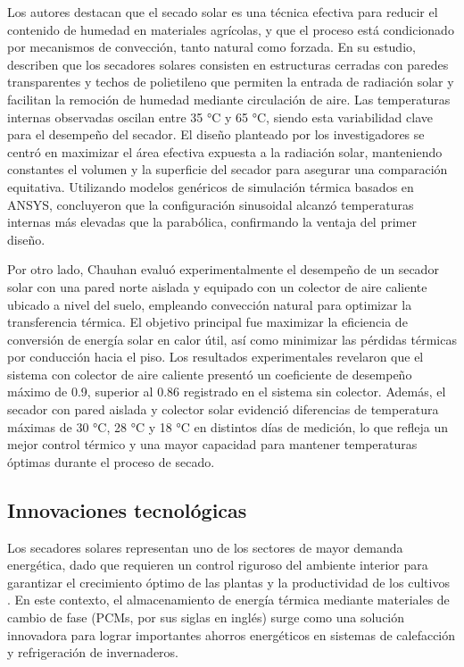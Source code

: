 \documentclass[12pt]{article}
\begin{document}
Los autores destacan que el secado solar es una técnica efectiva para reducir el contenido de humedad en materiales agrícolas, y que el proceso está condicionado por mecanismos de convección, tanto natural como forzada. En su estudio, describen que los secadores solares consisten en estructuras cerradas con paredes transparentes y techos de polietileno que permiten la entrada de radiación solar y facilitan la remoción de humedad mediante circulación de aire. Las temperaturas internas observadas oscilan entre 35 °C y 65 °C, siendo esta variabilidad clave para el desempeño del secador. El diseño planteado por los investigadores se centró en maximizar el área efectiva expuesta a la radiación solar, manteniendo constantes el volumen y la superficie del secador para asegurar una comparación equitativa. Utilizando modelos genéricos de simulación térmica basados en ANSYS, concluyeron que la configuración sinusoidal alcanzó temperaturas internas más elevadas que la parabólica, confirmando la ventaja del primer diseño.\\

\clearpage

Por otro lado, Chauhan \cite{Chauhan2018} evaluó experimentalmente el desempeño de un secador solar con una pared norte aislada y equipado con un colector de aire caliente ubicado a nivel del suelo, empleando convección natural para optimizar la transferencia térmica. El objetivo principal fue maximizar la eficiencia de conversión de energía solar en calor útil, así como minimizar las pérdidas térmicas por conducción hacia el piso. Los resultados experimentales revelaron que el sistema con colector de aire caliente presentó un coeficiente de desempeño máximo de 0.9, superior al 0.86 registrado en el sistema sin colector. Además, el secador con pared aislada y colector solar evidenció diferencias de temperatura máximas de 30 °C, 28 °C y 18 °C en distintos días de medición, lo que refleja un mejor control térmico y una mayor capacidad para mantener temperaturas óptimas durante el proceso de secado.


\subsection{Innovaciones tecnológicas}
Los secadores solares representan uno de los sectores de mayor demanda energética, dado que requieren un control riguroso del ambiente interior para garantizar el crecimiento óptimo de las plantas y la productividad de los cultivos \cite{Nishad2022}. En este contexto, el almacenamiento de energía térmica mediante materiales de cambio de fase (PCMs, por sus siglas en inglés) surge como una solución innovadora para lograr importantes ahorros energéticos en sistemas de calefacción y refrigeración de invernaderos.\\
\end{document}
